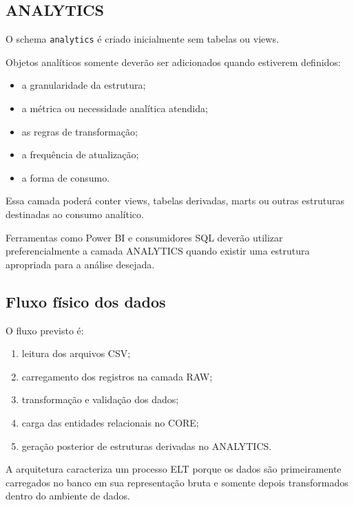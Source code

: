\documentclass[12pt,a4paper]{article}
\begin{document}
	\subsection{ANALYTICS}
	
	O schema \texttt{analytics} é criado inicialmente sem tabelas ou views.
	
	Objetos analíticos somente deverão ser adicionados quando estiverem
	definidos:
	
	\begin{itemize}[leftmargin=1.2cm]
		\item a granularidade da estrutura;
		\item a métrica ou necessidade analítica atendida;
		\item as regras de transformação;
		\item a frequência de atualização;
		\item a forma de consumo.
	\end{itemize}
	
	Essa camada poderá conter views, tabelas derivadas, marts ou outras
	estruturas destinadas ao consumo analítico.
	
	Ferramentas como Power BI e consumidores SQL deverão utilizar
	preferencialmente a camada ANALYTICS quando existir uma estrutura
	apropriada para a análise desejada.
	
	\subsection{Fluxo físico dos dados}
	
	O fluxo previsto é:
	
	\begin{enumerate}[leftmargin=1.2cm]
		\item leitura dos arquivos CSV;
		\item carregamento dos registros na camada RAW;
		\item transformação e validação dos dados;
		\item carga das entidades relacionais no CORE;
		\item geração posterior de estruturas derivadas no ANALYTICS.
	\end{enumerate}
	
	A arquitetura caracteriza um processo ELT porque os dados são
	primeiramente carregados no banco em sua representação bruta e somente
	depois transformados dentro do ambiente de dados.
	
\end{document}
